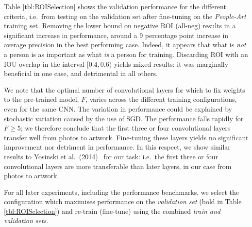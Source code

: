 \documentclass[runningheads]{llncs}
\begin{document}
Table \ref{tbl:ROISelection} shows the validation performance for the different criteria, i.e.\ from testing on the validation set after fine-tuning on the \textit{People-Art} training set.
Removing the lower bound on negative \ac{ROI} (all-neg) results in a significant increase in performance, around a 9 percentage point increase in average precision in the best performing case.
Indeed, it appears that what is \emph{not} a person is as important as what \emph{is} a person for training.
Discarding \ac{ROI} with an \ac{IOU} overlap in the interval
\begin{math}
  {[ {0.4},{0.6})}
\end{math}
yields mixed results: it was marginally beneficial in one case, and detrimental in all others.

We note that the optimal number of convolutional layers for which to fix weights to the pre-trained model,
\begin{math}
  F
\end{math}, varies across the different training configurations, even for the same \ac{CNN}.
The variation in performance could be explained by stochastic variation caused by the use of \ac{SGD}.
The performance falls rapidly for
\begin{math}
F \geq 5
\end{math};
we therefore conclude that the first three or four convolutional layers transfer well from \acp{photo} to artwork.
Fine-tuning these layers yields no significant improvement nor detriment in performance.
In this respect, we show similar results to Yosinski et al.\ (2014)~\cite{yosinski2014transferable} for our task: i.e.\ the first three or four convolutional layers are more transferable than later layers, in our case from \acp{photo} to \ac{artwork}.

For all later experiments, including the performance benchmarks, we select the configuration which maximises performance on the \textit{validation set} (bold in Table \ref{tbl:ROISelection}) and re-train (fine-tune) using the combined \textit{train and validation sets}.


 
\end{document}
